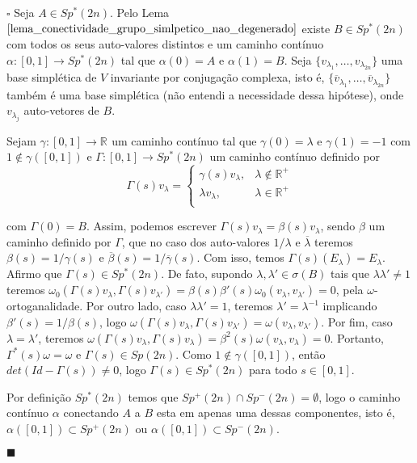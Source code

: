 \documentclass[12pt]{book}
\newenvironment{prova}[1]{$\square$ #1}{\hfill$\blacksquare$}
\newcommand{\formaSimpleticaPadrao}[2]{\omega_{0}(#1, #2)}
\newcommand{\funcaocond}[5]{
	#1 = 
	\left\{
	\begin{array}{cc}
		#2, & #3\\
		#4, & #5\\
	\end{array}
	\right.
}
\newcommand{\gruposimpletico}[1]{Sp(#1)}
\newcommand{\gruposimpleticonaodegenerado}[1]{Sp^{#1}(2n)}
\newcommand{\intervalo}{[0,1]}
\newcommand{\real}[1]{\mathbb{R}^{#1}}
\newcommand{\reta}{\real{}}
\newcommand{\vermelho}[1]{{\color{red}#1}}
\begin{document}
\begin{prova}
		Seja $A \in \gruposimpleticonaodegenerado{*}$. Pelo Lema $\ref{lema_conectividade_grupo_simlpetico_nao_degenerado}$ existe $B \in \gruposimpleticonaodegenerado{*}$ com todos os seus auto-valores distintos  e um caminho contínuo $\alpha:[0,1] \to \gruposimpleticonaodegenerado{*}$ tal que $\alpha(0)=A$ e $\alpha(1) = B$. Seja $\{v_{\lambda_{1}}, \dots , v_{\lambda_{2n}} \}$ uma base simplética de $V$ invariante por conjugação complexa, isto é, $\{\overline{v}_{\lambda_{1}}, \dots , \overline{v}_{\lambda_{2n}} \}$ também é uma base simplética \vermelho{(não entendi a necessidade dessa hipótese)}, onde $v_{\lambda_{j}}$ auto-vetores de $B$.
		
		Sejam $\gamma:[0,1]\to \reta$ um caminho contínuo tal que $\gamma(0) = \lambda$ e $\gamma(1) = -1$ com $1 \notin \gamma([0,1])$ e $\Gamma:[0,1 ]\to \gruposimpleticonaodegenerado{*}$ um caminho contínuo definido por
		$$
		\funcaocond{\Gamma(s)v_{\lambda}}{\gamma(s)v_{\lambda}}{\lambda \notin \real{+}}{\lambda v_{\lambda} }{\lambda \in \real{+}}
		$$
		
		com $\Gamma(0) = B$. Assim, podemos escrever $\Gamma(s)v_{\lambda} = \beta(s)v_{\lambda}$, sendo $\beta$ um caminho definido por $\Gamma$, que no caso dos auto-valores $1/\lambda$ e $\overline{\lambda}$ teremos $\beta(s) = 1/\gamma(s)$ e $\overline{\beta}(s) = 1/\overline{\gamma}(s)$. Com isso, temos $\Gamma(s)(E_{\lambda}) = E_{\lambda}$. Afirmo que $\Gamma(s) \in \gruposimpleticonaodegenerado{*}$. De fato, supondo $\lambda,\lambda' \in \sigma(B)$ tais que $\lambda\lambda' \neq 1$ teremos $\formaSimpleticaPadrao{\Gamma(s)v_{\lambda}}{\Gamma(s)v_{\lambda'}}= \beta(s)\beta'(s)\formaSimpleticaPadrao{v_{\lambda}}{v_{\lambda'}} = 0$, pela $\omega$-ortoganalidade. Por outro lado, caso $\lambda\lambda'=1$, teremos $\lambda'=\lambda^{-1}$ implicando $\beta'(s) = 1/\beta(s)$, logo $\omega(\Gamma(s)v_{\lambda},\Gamma(s)v_{\lambda'}) = \omega(v_{\lambda},v_{\lambda'})$. Por fim, caso $\lambda = \lambda'$, teremos $\omega(\Gamma(s)v_{\lambda},\Gamma(s)v_{\lambda}) = \beta^{2}(s)\omega(v_{\lambda},v_{\lambda}) =0$. Portanto, $\Gamma^{*}(s)\omega = \omega$ e $\Gamma(s) \in \gruposimpletico{2n}$. Como $1 \notin \gamma(\intervalo)$, então $det(Id - \Gamma(s))\neq 0 $, logo $\Gamma(s)\in \gruposimpleticonaodegenerado{*}$ para todo $s\in \intervalo$.
		
		Por definição $\gruposimpleticonaodegenerado{*}$ temos que $\gruposimpleticonaodegenerado{+} \cap \gruposimpleticonaodegenerado{-}=\emptyset$, logo o caminho contínuo $\alpha$ conectando $A$ a $B$ esta em apenas uma dessas componentes, isto é, $\alpha([0,1]) \subset \gruposimpleticonaodegenerado{+}$ ou $\alpha([0,1]) \subset \gruposimpleticonaodegenerado{-}$.
		

\end{prova}
\end{document}
